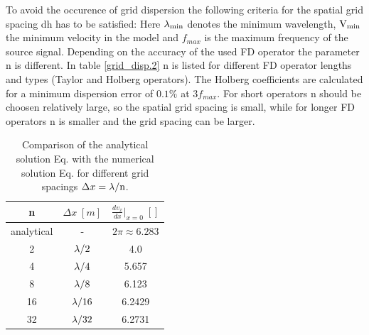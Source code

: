 \documentclass{hitec}
\begin{document}
To avoid the occurence of grid dispersion the following criteria for the spatial grid spacing dh has to be satisfied:
Here $\rm{\lambda_{min}}$ denotes the minimum wavelength, $\rm{V_{min}}$ the minimum velocity in the model and $f_{max}$ is the maximum
frequency of the source signal.  
Depending on the accuracy of the used FD operator the parameter n is different.  In table \ref{grid_disp.2} n is listed for different FD operator lengths 
and types (Taylor and Holberg operators). The Holberg coefficients are calculated for a minimum dispersion error of $0.1\%$ at $3 f_{max}$. For short operators n should be choosen relatively large, so the spatial grid spacing is small, while for longer FD operators n is smaller and the grid spacing can be larger. 
\begin{table}[hbt]
	\begin{center}
		\begin{tabular}{ccc}\hline \hline
			n &  $\Delta x\; [m]$ & $\frac{d v_x}{d x}|_{x=0}\; []$ \\ \hline 
			analytical & - & $2\pi \approx 6.283$ \\ 
			2 & $\rm{\lambda}/2$ & 4.0 \\ 
			4 & $\rm{\lambda}/4$ & 5.657 \\ 
			8 & $\rm{\lambda}/8$ & 6.123 \\ 
			16 & $\rm{\lambda}/16$ & 6.2429 \\ 
			32 & $\rm{\lambda}/32$ & 6.2731\\ \hline \hline
		\end{tabular}
		\caption{\label{grid_disp.1} Comparison of the analytical solution Eq.  with the numerical solution Eq.  
			for different grid spacings $\Delta x = \rm{\lambda /n}$.}
	\end{center}
\end{table}
\end{document}
